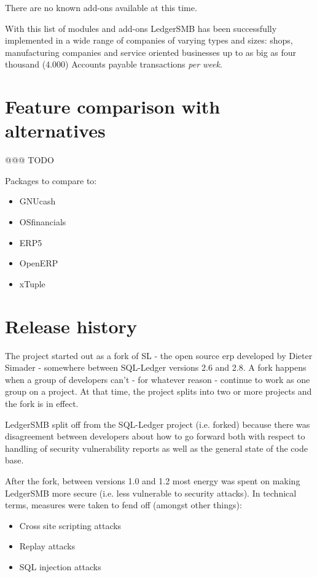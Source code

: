 There are no known \glspl{add-on} available at this time.

With this list of modules and \glspl{add-on} LedgerSMB has been successfully
implemented in a wide range of companies of varying types and sizes: shops,
manufacturing companies and service oriented businesses up to as big as four
thousand (4.000) Accounts payable transactions \emph{per week}.

\section{Feature comparison with alternatives}
\label{sec-ledgersmb-feature-comparison}
@@@ TODO

Packages to compare to:

\begin{itemize}
\item GNUcash
\item OSfinancials
\item ERP5
\item OpenERP
\item xTuple
\end{itemize}

\section{Release history}
\label{sec-ledgersmb-release-history}


The project started out as a fork of \gls{SL} - the open source \gls{erp}
developed by Dieter Simader - somewhere between SQL-Ledger versions 2.6
and 2.8.  A fork happens when a group of developers can't - for whatever
reason - continue to work as one group on a project.  At that time, the
project splits into two or more projects and the fork is in effect.

LedgerSMB split off from the SQL-Ledger project (i.e. forked) because
there was disagreement between developers about how to go forward both with
respect to handling of security vulnerability reports as well as the general
state of the code base.

After the fork, between versions 1.0 and 1.2 most energy was spent on
making LedgerSMB more secure (i.e. less vulnerable to security attacks).  In
technical terms, measures were taken to fend off (amongst other things):

\begin{itemize}
\item Cross site scripting attacks
\item Replay attacks
\item SQL injection attacks
\end{itemize}

